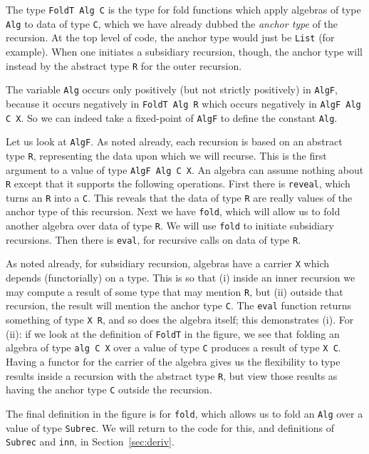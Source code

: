 \documentclass[a4paper,USenglish]{lipics-v2021}
\begin{document}
The type \verb|FoldT Alg C| is the type for fold functions which apply
algebras of type \verb|Alg| to data of type \verb|C|, which we have
already dubbed the \emph{anchor type} of the recursion.  At the top
level of code, the anchor type would just be \verb|List| (for
example).  When one initiates a subsidiary recursion, though, the
anchor type will instead by the abstract type \verb|R| for the outer recursion.

The variable \verb|Alg| occurs only positively (but not strictly
positively) in \verb|AlgF|, because it occurs negatively in
\verb|FoldT Alg R| which occurs negatively in \verb|AlgF Alg C X|.  So
we can indeed take a fixed-point of \verb|AlgF| to define the constant
\verb|Alg|.

Let us look at \verb|AlgF|.  As noted already, each recursion is based
on an abstract type \verb|R|, representing the data upon which we will
recurse.  This is the first argument to a value of type
\verb|AlgF Alg C X|.  An algebra can assume nothing about \verb|R|
except that it supports the following operations.  First there is
\verb|reveal|, which turns an \verb|R| into a \verb|C|.  This reveals
that the data of type \verb|R| are really values of the anchor type
of this recursion.  Next we have \texttt{fold}, which will allow us to fold
another algebra over data of type \verb|R|.  We will use \verb|fold|
to initiate subsidiary recursions.  Then there is \verb|eval|, for
recursive calls on data of type \verb|R|.

As noted already, for subsidiary recursion, algebras have a carrier
\verb|X| which depends (functorially) on a type.  This is so that (i)
inside an inner recursion we may compute a result of some type that
may mention \verb|R|, but (ii) outside that recursion, the result will
mention the anchor type \verb|C|.  The \verb|eval| function returns
something of type \verb|X R|, and so does the algebra itself; this
demonstrates (i).  For (ii): if we look at the definition of
\verb|FoldT| in the figure, we see that folding an algebra of type
\verb|alg C X| over a value of type \verb|C| produces a result of type
\verb|X C|.  Having a functor for the carrier of the algebra gives us
the flexibility to type results inside a recursion with the abstract
type \verb|R|, but view those results as having the anchor type
\verb|C| outside the recursion.

The final definition in the figure is for \verb|fold|, which allows
us to fold an \verb|Alg| over a value of type \verb|Subrec|.  We will
return to the code for this, and definitions of \verb|Subrec| and \verb|inn|,
in Section~\ref{sec:deriv}.
\end{document}
